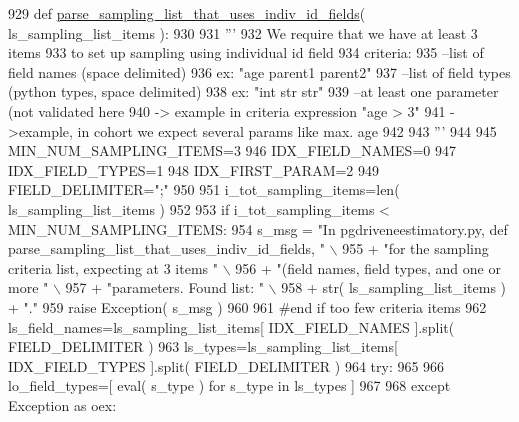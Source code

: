 \begin{DoxyCode}
929 \textcolor{keyword}{def }\hyperlink{namespacenegui_1_1pgdriveneestimator_a367b16a89c7ae46ab0bda5b37e68d9af}{parse\_sampling\_list\_that\_uses\_indiv\_id\_fields}( 
      ls\_sampling\_list\_items ):
930 
931     \textcolor{stringliteral}{'''}
932 \textcolor{stringliteral}{    We require that we have at least 3 items}
933 \textcolor{stringliteral}{    to set up  sampling using individual id field}
934 \textcolor{stringliteral}{    criteria:}
935 \textcolor{stringliteral}{    --list of field names (space delimited)}
936 \textcolor{stringliteral}{        ex: "age parent1 parent2"}
937 \textcolor{stringliteral}{    --list of field types (python types, space delimited)}
938 \textcolor{stringliteral}{        ex: "int str str"}
939 \textcolor{stringliteral}{    --at least one parameter (not validated here}
940 \textcolor{stringliteral}{        -> example in criteria expression  "age > 3"}
941 \textcolor{stringliteral}{        ->example, in cohort we expect several params like max. age     }
942 \textcolor{stringliteral}{}
943 \textcolor{stringliteral}{    '''}
944 
945     MIN\_NUM\_SAMPLING\_ITEMS=3
946     IDX\_FIELD\_NAMES=0
947     IDX\_FIELD\_TYPES=1
948     IDX\_FIRST\_PARAM=2
949     FIELD\_DELIMITER=\textcolor{stringliteral}{";"}
950 
951     i\_tot\_sampling\_items=len( ls\_sampling\_list\_items )
952 
953     \textcolor{keywordflow}{if} i\_tot\_sampling\_items < MIN\_NUM\_SAMPLING\_ITEMS:
954         s\_msg = \textcolor{stringliteral}{"In pgdriveneestimatory.py, def parse\_sampling\_list\_that\_uses\_indiv\_id\_fields, "} \(\backslash\)
955                     + \textcolor{stringliteral}{"for the sampling criteria list, expecting at 3 items "} \(\backslash\)
956                     + \textcolor{stringliteral}{"(field names, field types, and one or more "} \(\backslash\)
957                     + \textcolor{stringliteral}{"parameters.  Found list: "} \(\backslash\)
958                     + str( ls\_sampling\_list\_items ) + \textcolor{stringliteral}{"."}
959         \textcolor{keywordflow}{raise} Exception( s\_msg )
960 
961     \textcolor{comment}{#end if too few criteria items}
962     ls\_field\_names=ls\_sampling\_list\_items[ IDX\_FIELD\_NAMES ].split( FIELD\_DELIMITER )
963     ls\_types=ls\_sampling\_list\_items[ IDX\_FIELD\_TYPES ].split( FIELD\_DELIMITER )
964     \textcolor{keywordflow}{try}:
965 
966         lo\_field\_types=[ eval( s\_type ) \textcolor{keywordflow}{for} s\_type \textcolor{keywordflow}{in} ls\_types ]
967     
968     \textcolor{keywordflow}{except} Exception \textcolor{keyword}{as} oex:

\end{DoxyCode}
